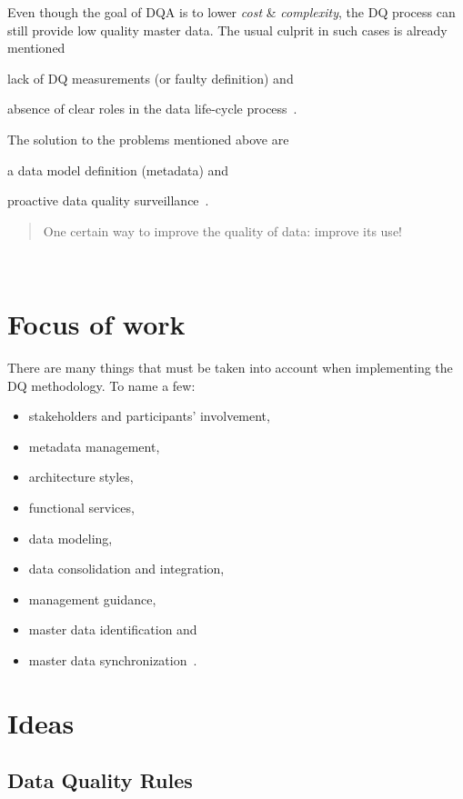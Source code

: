 Even though the goal of DQA is to lower \textit{cost} \& \textit{complexity}, the DQ process can still provide low quality master data.
The usual culprit in such cases is already mentioned
\begin{enumerate*}[label=(\roman*)]
    \item lack of DQ measurements (or faulty definition) and
    \item absence of clear roles in the data life-cycle process~\cite{haug2013}.
\end{enumerate*}

The solution to the problems mentioned above are
\begin{enumerate*}[label=(\roman*)]
    \item a data model definition (metadata) and
    \item proactive data quality surveillance~\cite{risto2011}.
\end{enumerate*}

\blockquote[][]{One certain way to improve the quality of data: improve its use!}~\cite{orr1998}

\section{Focus of work}

There are many things that must be taken into account when implementing the DQ methodology.
To name a few:

\begin{itemize}
    \item stakeholders and participants' involvement,
    \item metadata management,
    \item architecture styles,
    \item functional services,
    \item data modeling,
    \item data consolidation and integration,
    \item management guidance,
    \item master data identification and
    \item master data synchronization~\cite{loshin2008}.
\end{itemize}

\section{Ideas}

\subsection{Data Quality Rules}

